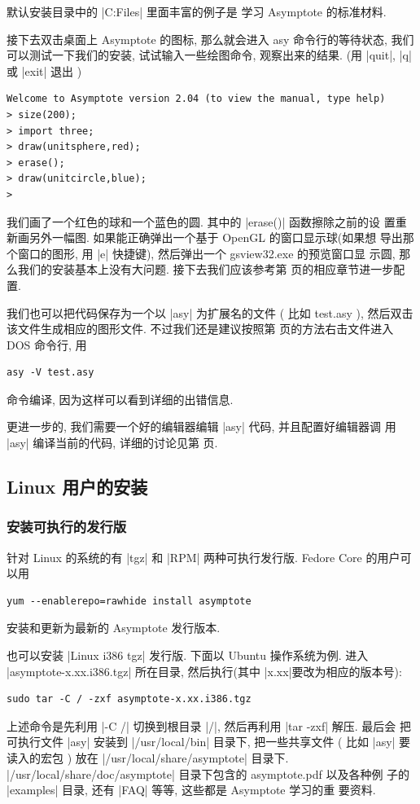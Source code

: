 \documentclass[nofonts,CJKnormalspaces]{ctexbook}[2009/05/20]
\begin{document}
默认安装目录中的 |C:\Program Files\Asymptote\examples| 里面丰富的例子是
学习 Asymptote 的标准材料.

接下去双击桌面上 Asymptote 的图标, 那么就会进入 asy 命令行的等待状态,
我们可以测试一下我们的安装, 试试输入一些绘图命令, 观察出来的结果. (用
|quit|, |q| 或 |exit| 退出 )
\begin{verbatim}
Welcome to Asymptote version 2.04 (to view the manual, type help)
> size(200);
> import three;
> draw(unitsphere,red);
> erase();
> draw(unitcircle,blue);
>
\end{verbatim}
我们画了一个红色的球和一个蓝色的圆. 其中的 |erase()| 函数擦除之前的设
置重新画另外一幅图. 如果能正确弹出一个基于 OpenGL 的窗口显示球(如果想
导出那个窗口的图形, 用 |e| 快捷键), 然后弹出一个 gsview32.exe 的预览窗口显
示圆, 那么我们的安装基本上没有大问题. 接下去我们应该参考第
\pageref{asy:Settings} 页的相应章节进一步配置.

我们也可以把代码保存为一个以 |asy| 为扩展名的文件 ( 比如 test.asy ),
然后双击该文件生成相应的图形文件. 不过我们还是建议按照第
\pageref{Windows:DOS} 页的方法右击文件进入 DOS 命令行, 用
\begin{verbatim}
asy -V test.asy
\end{verbatim}
命令编译, 因为这样可以看到详细的出错信息.

更进一步的, 我们需要一个好的编辑器编辑 |asy| 代码, 并且配置好编辑器调
用 |asy| 编译当前的代码, 详细的讨论见第 \pageref{asy:Editors} 页.

\subsection{Linux 用户的安装}
\subsubsection{安装可执行的发行版}
针对 Linux 的系统的有 |tgz| 和 |RPM| 两种可执行发行版.
Fedore Core 的用户可以用
\begin{verbatim}
yum --enablerepo=rawhide install asymptote
\end{verbatim}
安装和更新为最新的 Asymptote 发行版本.

也可以安装 |Linux i386 tgz| 发行版. 下面以
Ubuntu 操作系统为例. 进入 |asymptote-x.xx.i386.tgz| 所在目录,
然后执行(其中 |x.xx|要改为相应的版本号):

\begin{verbatim}
sudo tar -C / -zxf asymptote-x.xx.i386.tgz
\end{verbatim}
上述命令是先利用 |-C /| 切换到根目录 |/|, 然后再利用 |tar -zxf| 解压. 最后会
把可执行文件 |asy| 安装到 |/usr/local/bin| 目录下, 把一些共享文件
( 比如 |asy| 要读入的宏包 ) 放在 |/usr/local/share/asymptote| 目录下.
|/usr/local/share/doc/asymptote| 目录下包含的 asymptote.pdf 以及各种例
子的 |examples| 目录, 还有 |FAQ| 等等, 这些都是 Asymptote 学习的重
要资料.
\end{document}
